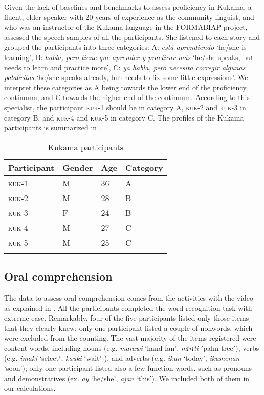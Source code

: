 \documentclass[output=paper]{langscibook}
\begin{document}
Given the lack of baselines and benchmarks to assess proficiency in Kukama, a fluent, elder speaker with 20 years of experience as the community linguist, and who was an instructor of the Kukama language in the FORMABIAP project, assessed the speech samples of all the participants. She listened to each story and grouped the participants into three categories: A: \textit{está aprendiendo} `he/she is learning', B: \textit{habla, pero tiene que aprender y practicar más} `he/she speaks, but needs to learn and practice more', C: \textit{ya habla, pero necesita corregir algunas palabritas} `he/she speaks already, but needs to fix some little expressions'. We interpret these categories as A being towards the lower end of the proficiency continuum, and C towards the higher end of the continuum. According to this specialist, the participant \textsc{kuk}{}-1 should be in category A, \textsc{kuk}{}-2 and \textsc{kuk}{}-3 in category B, and \textsc{kuk}{}-4 and \textsc{kuk}{}-5 in category C. The profiles of the Kukama participants is summarized in .

\begin{table}
\caption{Kukama participants}
\label{tab:7:2}
\begin{tabularx}{\textwidth}{QXXl}
\lsptoprule
Participant & Gender & Age & Category\\
\midrule
\textsc{kuk}{}-1 & M & 36 & A\\
\textsc{kuk}{}-2 & M & 28 & B\\
\textsc{kuk}{}-3 & F & 24 & B\\
\textsc{kuk}{}-4 & M & 27 & C\\
\textsc{kuk}{}-5 & M & 25 & C\\
\lspbottomrule
\end{tabularx}
\end{table}

\subsection{{{Oral comprehension}}}

The data to assess oral comprehension comes from the activities with the video as explained in . All the participants completed the word recognition task with extreme ease. Remarkably, four of the five participants listed only those items that they clearly knew; only one participant listed a couple of nonwords, which were excluded from the counting. The vast majority of the items registered were content words, including nouns (e.g. \textit{marawi} ‘hand fan’, \textit{mɨrɨti} ʼpalm treeʼ), verbs (e.g. \textit{imaki} ‘selectʼ, \textit{kauki} ‘waitʼ ), and adverbs (e.g. \textit{ikun} ‘today’, \textit{ikumenan} ‘soon’); only one participant listed also a few function words, such as pronouns and demonstratives (ex. \textit{ay} ‘he/she’, \textit{ajan} ‘this’). We included both of them in our calculations.
\end{document}
